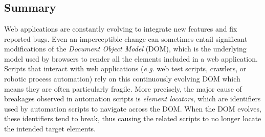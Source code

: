 \chapter{\erratum{}}\label{chap:erratum}
\section*{Summary}

Web applications are constantly evolving to integrate new features and fix reported bugs.
Even an imperceptible change can sometimes entail significant modifications of the \emph{Document Object Model} (DOM), which is the underlying model used by browsers to render all the elements included in a web application.
Scripts that interact with web applications (\emph{e.g.} web test scripts, crawlers, or robotic process automation) rely on this continuously evolving DOM which means they are often particularly fragile.
More precisely, the major cause of breakages observed in automation scripts is \emph{element locators}, which are identifiers used by automation scripts to navigate across the DOM. When the DOM evolves, these identifiers tend to break, thus causing the related scripts to no longer locate the intended target elements.

